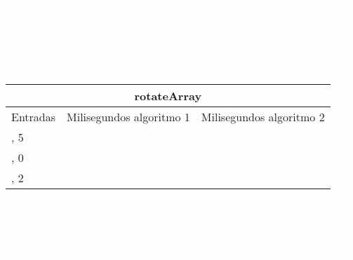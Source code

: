 \documentclass[a4paper,10pt]{article}
\begin{document}
\begin{enumerate}
            \begin{tcolorbox}[colback=black!20!black,colframe=sangria!85!black]
                \textcolor{white}{ \textbf{Justificación.\\}EL algoritmo 2 que se implemento consta de métodos auxiliares utilizando un solo for con if-else por lo que 
                                    sus complejidades son $O(n)$ y al implementar el método isSudokuValid se sumaron y multiplicaron estas dichas complejidades,generando así una complejidad $O(n^{2})$ }
               \end{tcolorbox} 
               
               
               \begin{table}[htb]
                \centering
                \begin{tabular}{|l|l|l|}
                \hline
                \multicolumn{3}{|c|}{rotateArray} \\ \hline
                Entradas & Milisegundos algoritmo 1 & Milisegundos algoritmo 2 \\
                \hline \hline
                [1,4,2,1,6,2,9], 5 & \hspace{1.3cm}{$\approx 37$}  & \hspace{1.3cm}{$\approx 6$} \\ \hline
                [4,2,7,5,4,3,7,2,5,3,4,1], 0 & \hspace{1.3cm}{$\approx 37$} & \hspace{1.3cm}{$\approx 1$} \\ \hline
                [3,2,1,4,2], 2 & \hspace{1.3cm}{$\approx 37$} & \hspace{1.3cm}{$\approx 1$} \\ \hline
                \end{tabular}
                \end{table}  
                
                \begin{tcolorbox}[colback=black!20!black,colframe=green(ncs)!85!black]
                    \textcolor{white}{ \textbf{Justificación.\\}El algoritmo 2 se implemento a base de de if-else y un for teniendo una complejidad $O(1)$ y 
                                      $O(n)$ respectivamente, dando como resultado la complejidad requerida $O(n)$.}
                   \end{tcolorbox} 
                       
                 

\end{enumerate}
\end{document}
